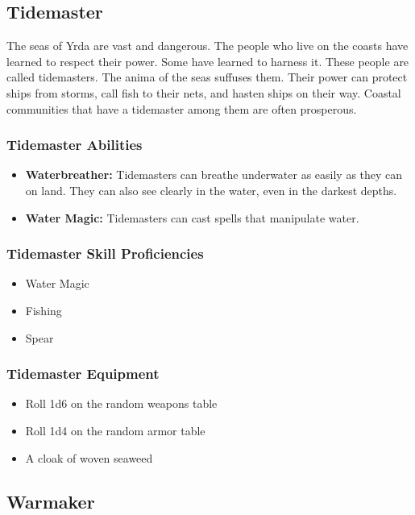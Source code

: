 \begin{multicols}{2}
\subsection{Tidemaster}

The seas of Yrda are vast and dangerous. The people who live on the coasts
have learned to respect their power. Some have learned to harness it. These
people are called tidemasters. The anima of the seas suffuses them. Their
power can protect ships from storms, call fish to their nets, and hasten
ships on their way. Coastal communities that have a tidemaster among them
are often prosperous.

\subsubsection{Tidemaster Abilities}

\begin{itemize}
  \item \textbf{Waterbreather:} Tidemasters can breathe underwater as easily
    as they can on land. They can also see clearly in the water, even in the
    darkest depths.
  \item \textbf{Water Magic:} Tidemasters can cast spells that manipulate water.
\end{itemize}

\subsubsection{Tidemaster Skill Proficiencies}

\begin{itemize}
  \item Water Magic
  \item Fishing
  \item Spear
\end{itemize}

\subsubsection{Tidemaster Equipment}

\begin{itemize}
  \item Roll 1d6 on the random weapons table
  \item Roll 1d4 on the random armor table
  \item A cloak of woven seaweed
\end{itemize}

\subsection{Warmaker}


\end{multicols}
